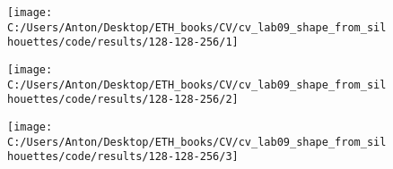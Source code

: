 \documentclass{report}
\begin{document}
	\begin{figure}[h]
	\begin{center}
		\label{tang1}
		\begin{minipage}[h]{0.29\linewidth}
			\texttt{[image: C:/Users/Anton/Desktop/ETH\_books/CV/cv\_lab09\_shape\_from\_silhouettes/code/results/128-128-256/1]}
		\end{minipage}
		\hfill
		\begin{minipage}[h]{0.29\linewidth}
			\texttt{[image: C:/Users/Anton/Desktop/ETH\_books/CV/cv\_lab09\_shape\_from\_silhouettes/code/results/128-128-256/2]}
		\end{minipage}
		\hfill
		\begin{minipage}[h]{0.29\linewidth}
			\texttt{[image: C:/Users/Anton/Desktop/ETH\_books/CV/cv\_lab09\_shape\_from\_silhouettes/code/results/128-128-256/3]}
		\end{minipage}
		

\end{center}
\end{figure}
\end{document}
